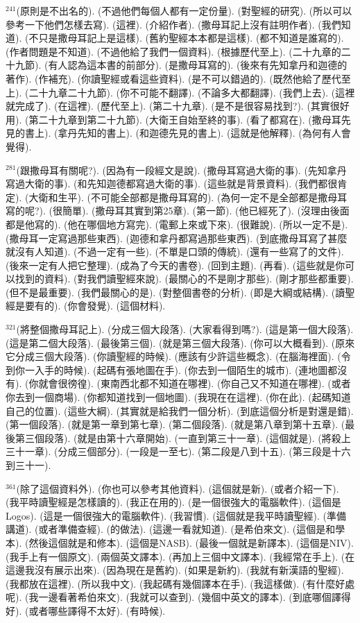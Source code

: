 \documentclass{book}
\begin{document}
$^{241}$(原則是不出名的).
(不過他們每個人都有一定份量).
(對聖經的研究).
(所以可以參考一下他們怎樣去寫).
(這裡).
(介紹作者).
(撒母耳記上沒有註明作者).
(我們知道).
(不只是撒母耳記上是這樣).
(舊約聖經本本都是這樣).
(都不知道是誰寫的).
(作者問題是不知道).
(不過他給了我們一個資料).
(根據歷代至上).
(二十九章的二十九節).
(有人認為這本書的前部分).
(是撒母耳寫的).
(後來有先知拿丹和迦德的著作).
(作補充).
(你讀聖經或看這些資料).
(是不可以錯過的).
(既然他給了歷代至上).
(二十九章二十九節).
(你不可能不翻譯).
(不論多大都翻譯).
(我們上去).
(這裡就完成了).
(在這裡).
(歷代至上).
(第二十九章).
(是不是很容易找到?).
(其實很好用).
(第二十九章到第二十九節).
(大衛王自始至終的事).
(看了都寫在).
(撒母耳先見的書上).
(拿丹先知的書上).
(和迦德先見的書上).
(這就是他解釋).
(為何有人會覺得).

$^{281}$(跟撒母耳有關呢?).
(因為有一段經文是說).
(撒母耳寫過大衛的事).
(先知拿丹寫過大衛的事).
(和先知迦德都寫過大衛的事).
(這些就是背景資料).
(我們都很肯定).
(大衛和生平).
(不可能全部都是撒母耳寫的).
(為何一定不是全部都是撒母耳寫的呢?).
(很簡單).
(撒母耳其實到第25章).
(第一節).
(他已經死了).
(沒理由後面都是他寫的).
(他在哪個地方寫完).
(電郵上來或下來).
(很難說).
(所以一定不是).
(撒母耳一定寫過那些東西).
(迦德和拿丹都寫過那些東西).
(到底撒母耳寫了甚麼就沒有人知道).
(不過一定有一些).
(不單是口頭的傳統).
(還有一些寫了的文件).
(後來一定有人把它整理).
(成為了今天的書卷).
(回到主題).
(再看).
(這些就是你可以找到的資料).
(對我們讀聖經來說).
(最關心的不是剛才那些).
(剛才那些都重要).
(但不是最重要).
(我們最關心的是).
(對整個書卷的分析).
(即是大綱或結構).
(讀聖經是要有的).
(你會發覺).
(這個材料).

$^{321}$(將整個撒母耳記上).
(分成三個大段落).
(大家看得到嗎?).
(這是第一個大段落).
(這是第二個大段落).
(最後第三個).
(就是第三個大段落).
(你可以大概看到).
(原來它分成三個大段落).
(你讀聖經的時候).
(應該有少許這些概念).
(在腦海裡面).
(令到你一入手的時候).
(起碼有張地圖在手).
(你去到一個陌生的城市).
(連地圖都沒有).
(你就會很徬徨).
(東南西北都不知道在哪裡).
(你自己又不知道在哪裡).
(或者你去到一個商場).
(你都知道找到一個地圖).
(我現在在這裡).
(你在此).
(起碼知道自己的位置).
(這些大綱).
(其實就是給我們一個分析).
(到底這個分析是對還是錯).
(第一個段落).
(就是第一章到第七章).
(第二個段落).
(就是第八章到第十五章).
(最後第三個段落).
(就是由第十六章開始).
(一直到第三十一章).
(這個就是).
(將殺上三十一章).
(分成三個部分).
(一段是一至七).
(第二段是八到十五).
(第三段是十六到三十一).

$^{361}$(除了這個資料外).
(你也可以參考其他資料).
(這個就是新).
(或者介紹一下).
(我平時讀聖經是怎樣讀的).
(我正在用的).
(是一個很強大的電腦軟件).
(這個是Logos).
(這是一個很強大的電腦軟件).
(我習慣).
(這個就是我平時讀聖經).
(準備講道).
(或者準備查經).
(的做法).
(這邊一看就知道).
(是希伯來文).
(這個是和學本).
(然後這個就是和修本).
(這個是NASB).
(最後一個就是新譯本).
(這個是NIV).
(我手上有一個原文).
(兩個英文譯本).
(再加上三個中文譯本).
(我經常在手上).
(在這邊我沒有展示出來).
(因為現在是舊約).
(如果是新約).
(我就有新漢語的聖經).
(我都放在這裡).
(所以我中文).
(我起碼有幾個譯本在手).
(我這樣做).
(有什麼好處呢).
(我一邊看著希伯來文).
(我就可以查到).
(幾個中英文的譯本).
(到底哪個譯得好).
(或者哪些譯得不太好).
(有時候).
\end{document}
